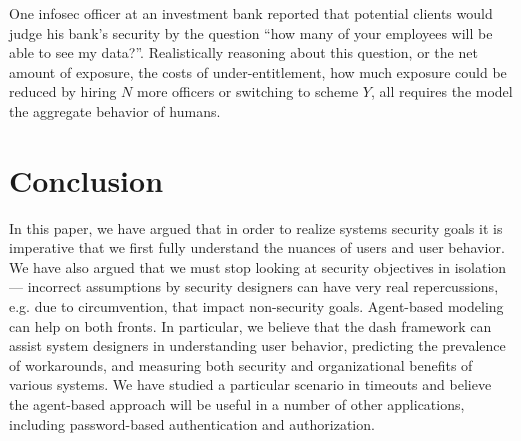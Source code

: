 \documentclass{acm_proc_article-sp}
\newcommand{\ignore}[1] {}
\begin{document}
One infosec officer at an investment bank reported that potential
clients would judge his bank's security by the question ``how many of
your employees will be able to see my data?''.  Realistically
reasoning about this question, or the net amount of exposure, the
costs of under-entitlement, how much exposure could be reduced by
hiring $N$ more officers or switching to scheme $Y$, all requires the
model the aggregate behavior of humans.



\ignore{(Indeed, X.509 PKI has often been lamented as costing too many
man-hours when deployed in practice, in large enterprises.  Could our
approach help explain this, and then help guide designers to reduce
these costs?)}

\ignore{BCMA....}

\section{Conclusion}
\label{sec-conclusion}

In this paper, we have argued that in order to realize systems
security goals it is imperative that we first fully understand the
nuances of users and user behavior.  We have also argued that we must
stop looking at security objectives in isolation --- incorrect
assumptions by security designers can have very real repercussions,
e.g. due to circumvention, that impact non-security goals. Agent-based
modeling can help on both fronts. In particular, we believe that the
{\sc dash} framework can assist system designers in understanding user
behavior, predicting the prevalence of workarounds, and measuring both
security and organizational benefits of various systems. We have
studied a particular scenario in timeouts and believe the agent-based
approach will be useful in a number of other applications, including
password-based authentication and authorization.

\small

\nocite{*}



\end{document}
